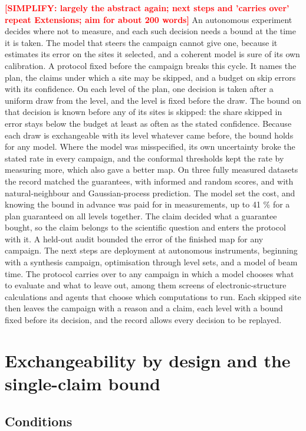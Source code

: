 \documentclass{iopjournal}
\newcommand{\ask}[1]{\textcolor{red}{\textbf{[#1]}}}
\begin{document}
\ask{SIMPLIFY: largely the abstract again; next steps and 'carries over' repeat Extensions; aim for about 200 words} An autonomous experiment decides where not to measure, and each such decision needs a bound at the time it is taken. The model that steers the campaign cannot give one, because it estimates its error on the sites it selected, and a coherent model is sure of its own calibration. A protocol fixed before the campaign breaks this cycle. It names the plan, the claims under which a site may be skipped, and a budget on skip errors with its confidence. On each level of the plan, one decision is taken after a uniform draw from the level, and the level is fixed before the draw. The bound on that decision is known before any of its sites is skipped: the share skipped in error stays below the budget at least as often as the stated confidence. Because each draw is exchangeable with its level whatever came before, the bound holds for any model. Where the model was misspecified, its own uncertainty broke the stated rate in every campaign, and the conformal thresholds kept the rate by measuring more, which also gave a better map. On three fully measured datasets the record matched the guarantees, with informed and random scores, and with natural-neighbour and Gaussian-process prediction. The model set the cost, and knowing the bound in advance was paid for in measurements, up to 41 \% for a plan guaranteed on all levels together. The claim decided what a guarantee bought, so the claim belongs to the scientific question and enters the protocol with it. A held-out audit bounded the error of the finished map for any campaign. The next steps are deployment at autonomous instruments, beginning with a synthesis campaign, optimisation through level sets, and a model of beam time. The protocol carries over to any campaign in which a model chooses what to evaluate and what to leave out, among them screens of electronic-structure calculations and agents that choose which computations to run. Each skipped site then leaves the campaign with a reason and a claim, each level with a bound fixed before its decision, and the record allows every decision to be replayed.


\appendix
\hypertarget{app:A}{%
\section{Exchangeability by design and the single-claim bound}\label{app:A}}

\hypertarget{conditions}{%
\subsection{Conditions}\label{conditions}}
\end{document}
